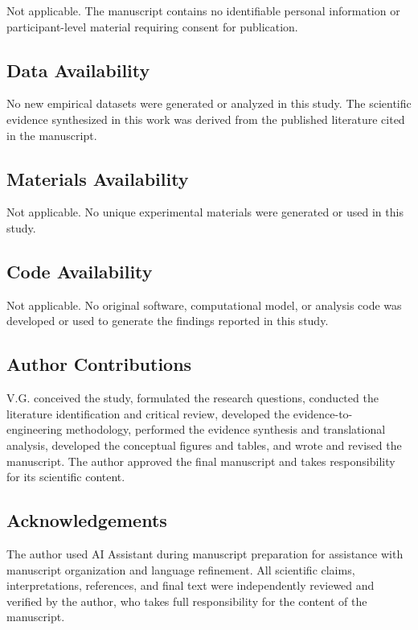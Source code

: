 \documentclass[pdflatex,sn-basic]{sn-jnl}
\theoremstyle{thmstyleone}
\theoremstyle{thmstyletwo}
\begin{document}
Not applicable. The manuscript contains no identifiable personal information
or participant-level material requiring consent for publication.


\subsection*{Data Availability}

No new empirical datasets were generated or analyzed in this study. The
scientific evidence synthesized in this work was derived from the published
literature cited in the manuscript.



\subsection*{Materials Availability}

Not applicable. No unique experimental materials were generated or used in
this study.


\subsection*{Code Availability}

Not applicable. No original software, computational model, or analysis code
was developed or used to generate the findings reported in this study.


\subsection*{Author Contributions}

V.G. conceived the study, formulated the research questions, conducted the
literature identification and critical review, developed the evidence-to-
engineering methodology, performed the evidence synthesis and translational
analysis, developed the conceptual figures and tables, and wrote and revised
the manuscript. The author approved the final manuscript and takes
responsibility for its scientific content.


\subsection*{Acknowledgements}

The author used AI Assistant during manuscript preparation for assistance
with manuscript organization and language refinement. All scientific claims, interpretations, references, and final text were independently reviewed and verified by the author, who takes full
responsibility for the content of the manuscript.


\end{document}
